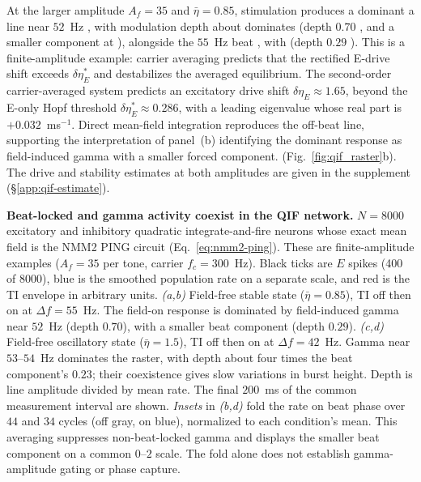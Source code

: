 \documentclass[11pt,a4paper]{article}
\providecommand{\DIFaddtex}[1]{{\protect\color{blue} \sf #1}} %
\providecommand{\DIFdeltex}[1]{{\protect\color{red} \scriptsize #1}} %
\providecommand{\DIFaddbegin}{} %
\providecommand{\DIFaddend}{} %
\providecommand{\DIFdelbegin}{} %
\providecommand{\DIFdelend}{} %
\providecommand{\DIFdelFL}[1]{\DIFdel{#1}} %
\providecommand{\DIFadd}[1]{\texorpdfstring{\DIFaddtex{#1}}{#1}} %
\providecommand{\DIFdel}[1]{\texorpdfstring{\DIFdeltex{#1}}{}} %
\begin{document}
At \DIFdelbegin \DIFdel{the larger amplitude }\DIFdelend $A_f=35$ and $\bar\eta=0.85$, \DIFdelbegin \DIFdel{stimulation produces
a dominant }\DIFdelend \DIFaddbegin \DIFadd{a }\DIFaddend line near $52$~Hz \DIFdelbegin \DIFdel{, with modulation depth about }\DIFdelend \DIFaddbegin \DIFadd{dominates
(depth }\DIFaddend $0.70$\DIFdelbegin \DIFdel{, and a smaller component
at }\DIFdelend \DIFaddbegin \DIFadd{), alongside }\DIFaddend the $55$~Hz beat \DIFdelbegin \DIFdel{, with }\DIFdelend \DIFaddbegin \DIFadd{(}\DIFaddend depth $0.29$\DIFaddbegin \DIFadd{). This is a
finite-amplitude example: carrier averaging predicts that the rectified
E-drive shift exceeds $\delta\eta_E^*$ and destabilizes the averaged equilibrium}\DIFaddend .
\DIFdelbegin \DIFdel{The second-order carrier-averaged system
predicts an excitatory drive shift $\delta\eta_E\approx1.65$, beyond the E-only
Hopf threshold $\delta\eta_E^*\approx0.286$, with a leading eigenvalue whose real
part is $+0.032$~ms$^{-1}$. }\DIFdelend Direct mean-field integration reproduces the off-beat line, \DIFdelbegin \DIFdel{supporting the
interpretation of panel~(b) }\DIFdelend \DIFaddbegin \DIFadd{identifying the
dominant response }\DIFaddend as field-induced gamma \DIFdelbegin \DIFdel{with a
smaller forced component.}\DIFdelend \DIFaddbegin \DIFadd{(Fig.~\ref{fig:qif_raster}b).
The drive and stability estimates at both amplitudes are given in the
supplement (\S\ref{app:qif-estimate}).
}\DIFaddend

\DIFdelbegin %
{%
\DIFdelFL{\textbf{Beat-locked and gamma activity coexist in the QIF network.} $N=8000$
excitatory and inhibitory quadratic integrate-and-fire neurons whose exact mean field is the
NMM2 PING circuit (Eq.~\eqref{eq:nmm2-ping}). These are finite-amplitude examples
($A_f=35$ per tone, carrier $f_c=300$~Hz). Black ticks are $E$ spikes (400 of 8000),
blue is the smoothed population rate on a separate scale, and red is the TI envelope
in arbitrary units. \emph{(a,b)} Field-free stable state ($\bar\eta=0.85$), TI off
then on at $\Delta f=55$~Hz. The field-on response is dominated by field-induced gamma near
$52$~Hz (depth $0.70$), with a smaller beat component (depth $0.29$).
\emph{(c,d)} Field-free oscillatory state ($\bar\eta=1.5$), TI off then on at
$\Delta f=42$~Hz. Gamma near $53$--$54$~Hz dominates the raster, with depth about
four times the beat component's $0.23$; their coexistence gives slow variations in
burst height. Depth is line amplitude divided by mean rate. The final $200$~ms of the
common measurement interval are shown. \emph{Insets} in \emph{(b,d)} fold the
rate on beat phase over $44$ and $34$ cycles (off gray, on blue), normalized to each
condition's mean. This averaging suppresses non-beat-locked gamma and displays the
smaller beat component on a common $0$--$2$ scale. The fold alone does not establish
gamma-amplitude gating or phase capture.}}
\end{document}
